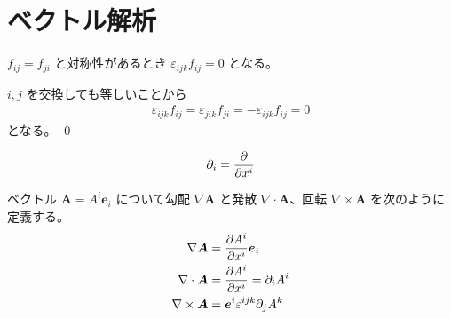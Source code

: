\documentclass[uplatex,dvipdfmx,a4paper,11pt]{jlreq}
\makeatletter
\renewcommand{\AA}{\bm{A}}
\newcommand{\ee}{\bm{e}}
\newcommand{\grad}{\nabla}
\renewcommand{\div}{\nabla\cdot}
\newcommand{\rot}{\nabla\times}
\theoremstyle{definition}
\renewenvironment{proof}[1][\proofname]{\par
  \normalfont
  \topsep6\p@\@plus6\p@ \trivlist
  \item[\hskip\labelsep{\bfseries #1}\@addpunct{\bfseries}]\ignorespaces\quad\par
}{%
  \qed\endtrivlist\@endpefalse
}
\renewcommand\proofname{証明}
\makeatother
\begin{document}
\section{ベクトル解析}
\begin{theorem}
  $f_{ij} = f_{ji}$ と対称性があるとき $\varepsilon_{ijk}f_{ij} = 0$ となる。
\end{theorem}
\begin{proof}
  $i, j$ を交換しても等しいことから
  \begin{align}
    \varepsilon_{ijk}f_{ij} = \varepsilon_{jik}f_{ji} = -\varepsilon_{ijk}f_{ij} = 0
  \end{align}
  となる。
\end{proof}
\begin{definition}
  \begin{align}
    \partial_i = \diffp{}{x^i}
  \end{align}
\end{definition}
\begin{definition}
  ベクトル $\AA = A^i\ee_i$ について勾配 $\grad{\AA}$ と発散 $\div{\AA}$、回転 $\rot{\AA}$ を次のように定義する。
  \begin{align}
    \grad{\bm{A}} & = \diffp{A^i}{x^i}\ee_i                  \\
    \div{\bm{A}}  & = \diffp{A^i}{x^i} = \partial_iA^i       \\
    \rot{\bm{A}}  & = \bm{e}^i\varepsilon^{ijk}\partial_jA^k
  \end{align}
\end{definition}
\end{document}
